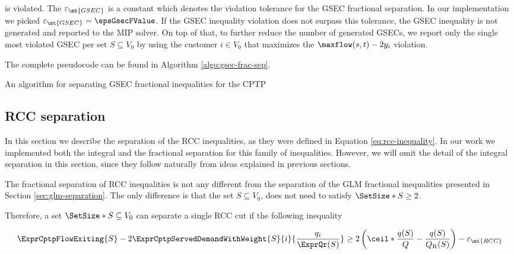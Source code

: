 is violated.
The $\varepsilon_{\mt{GSEC}}$ is a constant which denotes the violation tolerance for the GSEC fractional separation.
In our implementation we picked $\varepsilon_{\mt{GSEC}} = \epsGsecFValue$.
If the GSEC inequality violation does not surpass this tolerance, the GSEC inequality is not generated and reported to the MIP solver.
On top of that, to further reduce the number of generated GSECs, we report only the single most violated GSEC per set $S \subseteq V_0$ by using the customer $i \in V_0$ that maximizes the $\maxflow(s, t) - 2 y_i$ violation.

The complete pseudocode can be found in Algorithm \ref{algo:gsec-frac-sep}.

\begin{algorithm}
	\caption{An algorithm for separating GSEC fractional inequalities for the CPTP}
	\label{algo:gsec-frac-sep}
	
\end{algorithm}

\subsection{RCC separation}
\label{sec:impl-rcc-separation}

In this section we describe the separation of the RCC inequalities, as they were defined in Equation \eqref{eq:rcc-inequality}.
In our work we implemented both the integral and the fractional separation for this family of inequalities.
However, we will omit the detail of the integral separation in this section, since they follow naturally from ideas explained in previous sections.

The fractional separation of RCC inequalities is not any different from the separation of the GLM fractional inequalities presented in Section \ref{sec:glm-separation}.
The only difference is that the set $S \subseteq V_0$, does not need to satisfy $\SetSize*{S} \ge 2$.

Therefore, a set $\SetSize*{S} \subseteq V_0$ can separate a single RCC cut if the following inequality

\begin{equation}
	\begin{split}
		\ExprCptpFlowExiting{S} -2 \ExprCptpServedDemandWithWeight{S}{i}{\frac{q_i}{\ExprQr(S)}}    \ge   2 \left( \ceil*{ \frac{q(S)}{Q}} - \frac{q(S)}{Q_{\mathrm{R}}(S)} \right) - \varepsilon_{\mt{RCC}}
	\end{split}
\end{equation}

